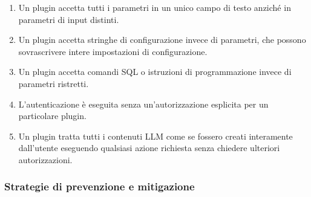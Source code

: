 \documentclass[
]{article}
\providecommand{\tightlist}{%
  \setlength{\itemsep}{0pt}\setlength{\parskip}{0pt}}
\begin{document}
\begin{enumerate}
\def\labelenumi{\arabic{enumi}.}
\tightlist
\item
  Un plugin accetta tutti i parametri in un unico campo di testo anziché
  in parametri di input distinti.
\item
  Un plugin accetta stringhe di configurazione invece di parametri, che
  possono sovrascrivere intere impostazioni di configurazione.
\item
  Un plugin accetta comandi SQL o istruzioni di programmazione invece di
  parametri ristretti.
\item
  L'autenticazione è eseguita senza un'autorizzazione esplicita per un
  particolare plugin.
\item
  Un plugin tratta tutti i contenuti LLM come se fossero creati
  interamente dall'utente eseguendo qualsiasi azione richiesta senza
  chiedere ulteriori autorizzazioni.
\end{enumerate}

\subsubsection{Strategie di prevenzione e
mitigazione}\label{strategie-di-prevenzione-e-mitigazione}
\end{document}
